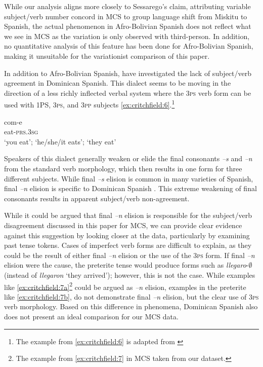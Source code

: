 \documentclass[output=paper,colorlinks,citecolor=brown,
]{langscibook}
\begin{document}
While our analysis aligns more closely to Sessarego's claim, attributing variable subject/verb number concord in MCS to group language shift from Miskitu to Spanish, the actual phenomenon in Afro-Bolivian Spanish does not reflect what we see in MCS as the variation is only observed with third-person. In addition, no quantitative analysis of this feature has been done for Afro-Bolivian Spanish, making it unsuitable for the variationist comparison of this paper.

In addition to Afro-Bolivian Spanish, \cite{foote2012role} have investigated the lack of subject/verb agreement in Dominican Spanish. This dialect seems to be moving in the direction of a less richly inflected verbal system where the \textsc{3ps} verb form can be used with 1PS, \textsc{3ps}, and \textsc{3pp} subjects \ref{ex:critchfield:6}.\footnote{The example from \ref{ex:critchfield:6} is adapted from \citet[432]{foote2012role}}



\begin{exe} %
    \ex\label{ex:critchfield:6} 
  \gll com-e\\
  eat-\textsc{prs}.\textsc{3sg}\\
 \glt `you eat'; `he/she/it eats'; `they eat'\\
\end{exe}

Speakers of this dialect generally weaken or elide the final consonants \textit{–s} and \textit{–n} from the standard verb morphology, which then results in one form for three different subjects. While final \textit{–s} elision is common in many varieties of Spanish, final \textit{–n} elision is specific to Dominican Spanish \citep[364]{lipskirecuero1996}. This extreme weakening of final consonants results in apparent subject/verb non-agreement. 

While it could be argued that final \textit{–n} elision is responsible for the subject/verb disagreement discussed in this paper for MCS, we can provide clear evidence against this suggestion by looking closer at the data, particularly by examining past tense tokens. Cases of imperfect verb forms are difficult to explain, as they could be the result of either final \textit{–n} elision or the use of the \textsc{3ps} form. If final \textit{–n} elision were the cause, the preterite tense would produce forms such as \textit{llegaro}-$\emptyset$ (instead of \textit{llegaron} `they arrived'); however, this is not the case. While examples like \ref{ex:critchfield:7a}\footnote{The example from \ref{ex:critchfield:7} in MCS taken from our dataset.} could be argued as \textit{–n} elision, examples in the preterite like \ref{ex:critchfield:7b}, do not demonstrate final \textit{–n} elision, but the clear use of \textsc{3ps} verb morphology. Based on this difference in phenomena, Dominican Spanish also does not present an ideal comparison for our MCS data.
\end{document}

